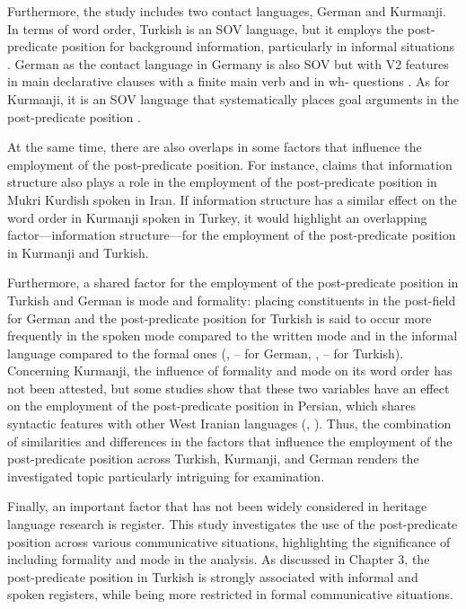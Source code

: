 Furthermore, the study includes two contact languages, German and Kurmanji. In terms of word order, Turkish is an SOV language, but it employs the post-predicate position for background information, particularly in informal situations \citep{Schroeder1995}. German as the contact language in Germany is also SOV but with V2 features in main declarative clauses with a finite main verb and in wh- questions \citep{Muller2023}. As for Kurmanji, it is an SOV language that systematically places goal arguments in the post-predicate position \citep{Haig2018}.

At the same time, there are also overlaps in some factors that influence the employment of the post-predicate position. For instance, \citet{Asadpour2021} claims that information structure also plays a role in the employment of the post-predicate position in Mukri Kurdish spoken in Iran. If information structure has a similar effect on the word order in Kurmanji spoken in Turkey, it would highlight an overlapping factor—information structure—for the employment of the post-predicate position in Kurmanji and Turkish.

Furthermore, a shared factor for the employment of the post-predicate position in Turkish and German is mode and formality: placing constituents in the post-field for German and the post-predicate position for Turkish is said to occur more frequently in the spoken mode compared to the written mode and in the informal language compared to the formal ones (\citealt{Roelcke1997}, \citealt{Tsehaye2023} -- for German, \citealt{Erguvanli1984}, \citealt{Schroeder1995} -- for Turkish). Concerning Kurmanji, the influence of formality and mode on its word order has not been attested, but some studies show that these two variables have an effect on the employment of the post-predicate position in Persian, which shares syntactic features with other West Iranian languages (\citealt{Frommer1981}, \citealt{Haig_post-predicate_EtAl2024-1}). Thus, the combination of similarities and differences in the factors that influence the employment of the post-predicate position across Turkish, Kurmanji, and German renders the investigated topic particularly intriguing for examination.

Finally, an important factor that has not been widely considered in heritage language research is register. This study investigates the use of the post-predicate position across various communicative situations, highlighting the significance of including formality and mode in the analysis. As discussed in Chapter 3, the post-predicate position in Turkish is strongly associated with informal and spoken registers, while being more restricted in formal communicative situations.

